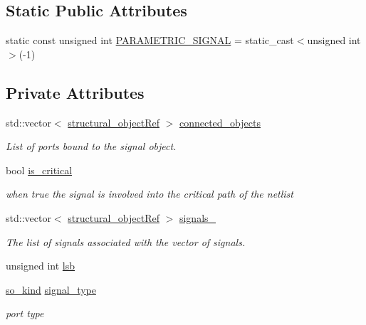 \subsection*{Static Public Attributes}
\begin{DoxyCompactItemize}
\item 
static const unsigned int \hyperlink{classsignal__o_a95d8799c5c71954adba4f8bdfb1e4f10}{P\+A\+R\+A\+M\+E\+T\+R\+I\+C\+\_\+\+S\+I\+G\+N\+AL} = static\+\_\+cast$<$unsigned int$>$(-\/1)
\end{DoxyCompactItemize}
\subsection*{Private Attributes}
\begin{DoxyCompactItemize}
\item 
std\+::vector$<$ \hyperlink{structural__objects_8hpp_a8ea5f8cc50ab8f4c31e2751074ff60b2}{structural\+\_\+object\+Ref} $>$ \hyperlink{classsignal__o_aaae8e7a528334b31655217dab0d36acb}{connected\+\_\+objects}
\begin{DoxyCompactList}\small\item\em List of ports bound to the signal object. \end{DoxyCompactList}\item 
bool \hyperlink{classsignal__o_a74be21f14c8bb79c0f2427fa2234afee}{is\+\_\+critical}
\begin{DoxyCompactList}\small\item\em when true the signal is involved into the critical path of the netlist \end{DoxyCompactList}\item 
std\+::vector$<$ \hyperlink{structural__objects_8hpp_a8ea5f8cc50ab8f4c31e2751074ff60b2}{structural\+\_\+object\+Ref} $>$ \hyperlink{classsignal__o_ab1fba733f5b6851a70b1f63f6edf3a83}{signals\+\_\+}
\begin{DoxyCompactList}\small\item\em The list of signals associated with the vector of signals. \end{DoxyCompactList}\item 
unsigned int \hyperlink{classsignal__o_a8dece1049d2b9baffd905f80d0baa578}{lsb}
\item 
\hyperlink{structural__objects_8hpp_acf52399aecacb7952e414c5746ce6439}{so\+\_\+kind} \hyperlink{classsignal__o_ad09abb984f514b0927d63389c72c86f6}{signal\+\_\+type}
\begin{DoxyCompactList}\small\item\em port type \end{DoxyCompactList}\end{DoxyCompactItemize}
